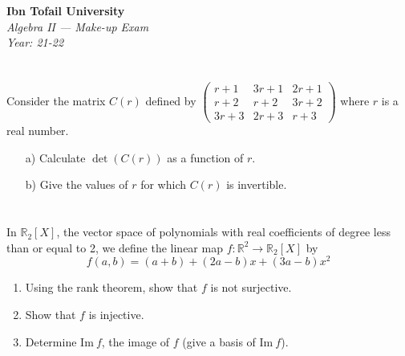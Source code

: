 \documentclass[12pt]{article}
\begin{document}
\begin{center}
  \Large\textbf{Ibn Tofail University} \\[1em]
  \large\textit{Algebra II — Make-up Exam} \\[0.5em]
  \large\textit{Year: 21-22} \\[2em]
\end{center}

\vspace{0.5cm}

\section{}
Consider the matrix $C(r)$ defined by
$\begin{pmatrix}
r+1 & 3r+1 & 2r+1 \\
r+2 & r+2 & 3r+2 \\
3r+3 & 2r+3 & r+3
\end{pmatrix}$
where $r$ is a real number.
\begin{enumerate}
\item[a)] Calculate $\det(C(r))$ as a function of $r$.
\item[b)] Give the values of $r$ for which $C(r)$ is invertible.
\end{enumerate}

\begin{answerbox}
\end{answerbox}

\newpage  
\section{}
In $\mathbb{R}_2[X]$, the vector space of polynomials with real coefficients of degree less than or equal to 2, we define the linear map $f: \mathbb{R}^2 \rightarrow \mathbb{R}_2[X]$ by
\begin{equation*}
f(a,b) = (a + b) + (2a - b)x + (3a - b)x^2
\end{equation*}

\begin{enumerate}
\item Using the rank theorem, show that $f$ is not surjective.
\item Show that $f$ is injective.
\item Determine $\text{Im}\ f$, the image of $f$ (give a basis of $\text{Im}\ f$).
\end{enumerate}
\end{document}
